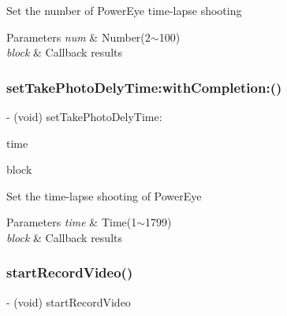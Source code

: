Set the number of Power\+Eye time-\/lapse shooting


\begin{DoxyParams}{Parameters}
{\em num} & Number(2$\sim$100) \\
\hline
{\em block} & Callback results \\
\hline
\end{DoxyParams}
\mbox{\label{interface_p_v_camera_a1025de7edd08b2aa6a020bb484746c8d}} 
\subsubsection{\texorpdfstring{set\+Take\+Photo\+Dely\+Time\+:with\+Completion\+:()}{setTakePhotoDelyTime:withCompletion:()}}
{\footnotesize\ttfamily -\/ (void) set\+Take\+Photo\+Dely\+Time\+: \begin{DoxyParamCaption}\item[{(N\+S\+Integer)}]{time }\item[{withCompletion:(P\+V\+Completion\+Block)}]{block }\end{DoxyParamCaption}}

Set the time-\/lapse shooting of Power\+Eye


\begin{DoxyParams}{Parameters}
{\em time} & Time(1$\sim$1799) \\
\hline
{\em block} & Callback results \\
\hline
\end{DoxyParams}
\mbox{\label{interface_p_v_camera_ae61a3cfbad1930093b1284f18425ffc0}} 
\subsubsection{\texorpdfstring{start\+Record\+Video()}{startRecordVideo()}}
{\footnotesize\ttfamily -\/ (void) start\+Record\+Video \begin{DoxyParamCaption}{ }\end{DoxyParamCaption}}

